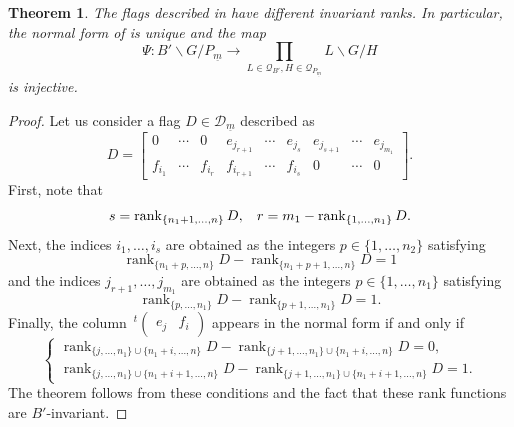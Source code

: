 \documentclass[pdftex]{sigma}
\numberwithin{equation}{section}
\newtheorem{Theorem}{Theorem}[section]
\newtheorem{Proposition}[Theorem]{Proposition}
\theoremstyle{definition}
\newcommand{\rank}{\operatorname{rank}}
\newcommand{\D}{\mathcal{D}}
\theoremstyle{plain}
\theoremstyle{plain}
\theoremstyle{plain}
\theoremstyle{plain}
\begin{document}
\begin{Theorem}{\label{normal form unique}}
	The flags described in  have different invariant ranks. In particular, the normal form of  is unique and the map
	\begin{equation*}
		\Psi : B'\backslash G/P_{\underline m} \to \displaystyle \prod_{L \in \mathcal Q_{B'}, H \in \mathcal Q_{P_{\underline m}}} L\backslash G/H
	\end{equation*}
	is injective.
\end{Theorem}
\begin{proof}
	Let us consider a flag $D \in \D_{\underline m}$ described as
	\begin{equation*}
		D = \begin{bmatrix}
		0 & \cdots & 0  & e_{j_{r+1}} & \cdots & e_{j_{s}} & e_{j_{s+1}} & \cdots & e_{j_{m_1}} \\
		f_{i_1} & \cdots & f_{i_{r}}  & f_{i_{r+1}} & \cdots & f_{i_s} & 0 & \cdots & 0
	\end{bmatrix}.
	\end{equation*}
	First, note that 
	\begin{equation*}
		s = \rank_{\{n_1+1,\dots,n\}}D, \hspace{3mm} r = m_1-\rank_{\{1,\dots,n_1\}}D.
	\end{equation*}
	Next, the indices $i_1,\dots,i_s$ are obtained as the integers $p \in \{1,\dots,n_2\}$ satisfying
	\begin{equation*}
		\rank_{\{n_1+p,\dots,n\}}D - \rank_{\{n_1+p+1,\dots,n\}}D = 1
	\end{equation*}
	and the indices $j_{{r}+1},\dots,j_{m_1}$ are obtained as the integers $p \in \{1,\dots,n_1\}$ satisfying
	\begin{equation*}
		\rank_{\{p,\dots,n_1\}}D - \rank_{\{p+1,\dots,n_1\}}D = 1.
	\end{equation*}
	Finally, the column $\,^t\begin{pmatrix}
		e_j & f_i
	\end{pmatrix}$
	appears in the normal form if and only if
	\begin{equation*}
		\begin{cases}
		\rank_{\{j,\dots,n_1\}\cup \{n_1+i,\dots,n\}}D - \rank_{\{j+1,\dots,n_1\} \cup \{n_1+i,\dots,n\}}D = 0, \\
		\rank_{\{j,\dots,n_1\}\cup \{n_1+i+1,\dots,n\}}D - \rank_{\{j+1,\dots,n_1\} \cup \{n_1+i+1,\dots,n\}}D = 1.
	\end{cases}
	\end{equation*}
	The theorem follows from these conditions and the fact that these rank functions are $B'$-invariant.
\end{proof}
\end{document}
